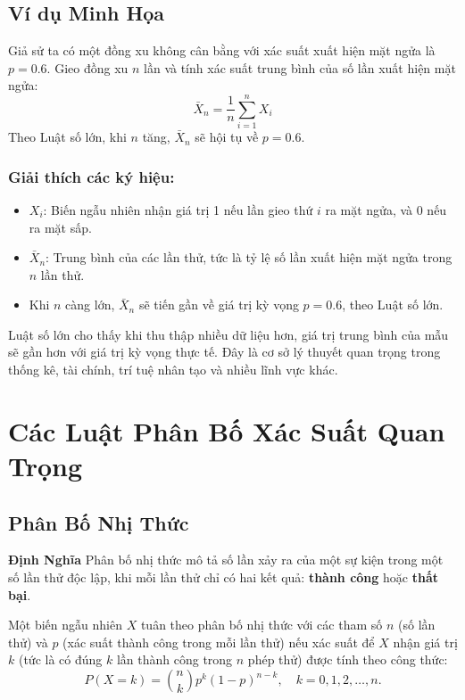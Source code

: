\subsection{Ví dụ Minh Họa}
Giả sử ta có một đồng xu không cân bằng với xác suất xuất hiện mặt ngửa là $p = 0.6$. Gieo đồng xu $n$ lần và tính xác suất trung bình của số lần xuất hiện mặt ngửa:
\begin{equation}
\bar{X}_n = \frac{1}{n} \sum_{i=1}^{n} X_i
\end{equation}
Theo Luật số lớn, khi $n$ tăng, $\bar{X}_n$ sẽ hội tụ về $p = 0.6$.

\subsubsection*{Giải thích các ký hiệu:}
\begin{itemize}
    \item $X_i$: Biến ngẫu nhiên nhận giá trị 1 nếu lần gieo thứ $i$ ra mặt ngửa, và 0 nếu ra mặt sấp.
    \item $\bar{X}_n$: Trung bình của các lần thử, tức là tỷ lệ số lần xuất hiện mặt ngửa trong $n$ lần thử.
    \item Khi $n$ càng lớn, $\bar{X}_n$ sẽ tiến gần về giá trị kỳ vọng $p = 0.6$, theo Luật số lớn.
\end{itemize}


Luật số lớn cho thấy khi thu thập nhiều dữ liệu hơn, giá trị trung bình của mẫu sẽ gần hơn với giá trị kỳ vọng thực tế. Đây là cơ sở lý thuyết quan trọng trong thống kê, tài chính, trí tuệ nhân tạo và nhiều lĩnh vực khác.





\section{Các Luật Phân Bố Xác Suất Quan Trọng}
\subsection{Phân Bố Nhị Thức}
\textbf{Định Nghĩa}
Phân bố nhị thức mô tả số lần xảy ra của một sự kiện trong một số lần thử độc lập, khi mỗi lần thử chỉ có hai kết quả: \textbf{thành công} hoặc \textbf{thất bại}.

Một biến ngẫu nhiên $X$ tuân theo phân bố nhị thức với các tham số $n$ (số lần thử) và $p$ (xác suất thành công trong mỗi lần thử) nếu xác suất để $X$ nhận giá trị $k$ (tức là có đúng $k$ lần thành công trong $n$ phép thử) được tính theo công thức:
\begin{equation}
    P(X = k) = \binom{n}{k} p^k (1-p)^{n-k}, \quad k = 0,1,2,\dots,n.
\end{equation}

